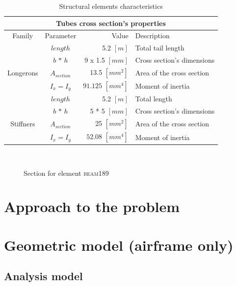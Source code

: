 \begin{table}[h!]
	\centering
	
	\begin{tabular}{c c r l} 
		\toprule
		\multicolumn{4}{c}{Tubes cross section's properties}\\
		\midrule
		Family & Parameter & Value & Description \\
				
		\midrule
		& $length$ &  5.2 $[m]$ & Total tail length \\
		& $b \, * \, h$ &  9 x 1.5 $[mm]$ &  Cross section's dimensions\\ 
		Longerons & $A_{section}$  &  13.5 $[mm^2]$ & Area of the cross section \\ 
		& $I_{x} = I_{y}$ &  $91.125$ $[mm^4]$ & Moment of inertia \\ 
		
		
		\midrule
		& $length$ &  5.2 $[m]$ & Total length \\
		& $b \, * \, h$ &  5 * 5 $[mm]$ &  Cross section's dimensions\\ 
		Stiffners & $A_{section}$  &  25 $[mm^2]$ & Area of the cross section \\ 
		& $I_{x} = I_{y}$ &  $52.08$ $[mm^4]$ & Moment of inertia \\ 	
		
		\bottomrule
	\end{tabular}
	\caption{Structural elements characteristics}
	
\end{table}

\begin{figure}[!htb]
	\centering
	 \quad
	\\
	\caption{Section for element \textsc{beam189}}
	\label{fig:SectionGeometry}
\end{figure}

\clearpage
\section*{Approach to the problem}
\section{Geometric model (airframe only)}
\subsection*{Analysis model}

